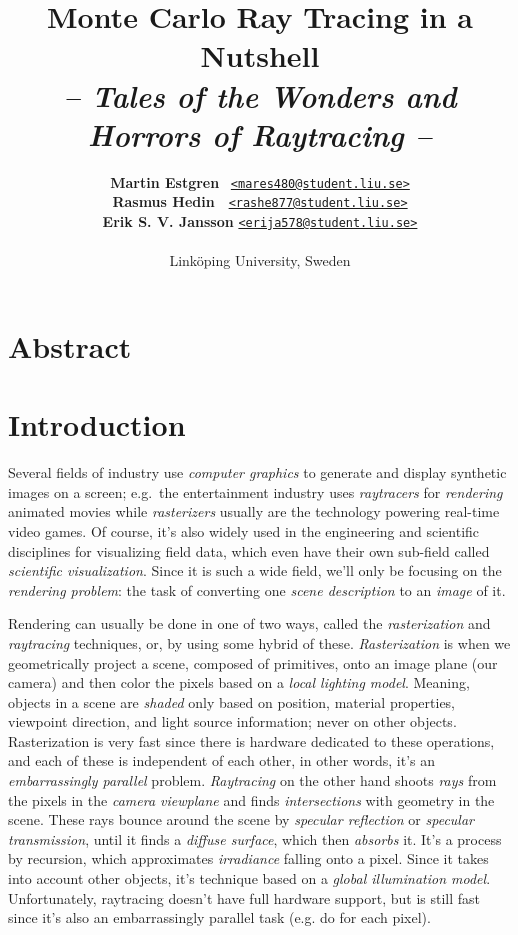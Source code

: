 \documentclass[a4paper, twocolumn]{article}
\title{\textbf{Monte Carlo Ray Tracing in a Nutshell}\\
       \Large{\textit{-- Tales of the Wonders and Horrors of Raytracing --}}}
\author{{\textbf{Martin Estgren}} \;\;\;\;\;\;\,   {\href{mailto:mares480@student.liu.se}
                                                       {\texttt{<mares480@student.liu.se>}}} \\
        {\textbf{Rasmus Hedin}} \;\;\;\;\;\;\;\,\, {\href{mailto:rashe877@student.liu.se}
                                                       {\texttt{<rashe877@student.liu.se>}}} \\
        {\textbf{Erik S. V. Jansson}} \;           {\href{mailto:erija578@student.liu.se}
                                                       {\texttt{<erija578@student.liu.se>}}} \\~\\
        {Linköping University, Sweden}\vspace{-2.0ex}}
\begin{document}
    \maketitle
    \section*{Abstract}

    \newpage \tableofcontents \clearpage

    \section{Introduction} \label{sec:introduction}

        Several fields of industry use \emph{computer graphics} to generate and display synthetic images on a screen; e.g.\ the entertainment industry uses \emph{raytracers} for \emph{rendering} animated movies while \emph{rasterizers} usually are the technology powering real-time video games. Of course, it's also widely used in the engineering and scientific disciplines for visualizing field data, which even have their own sub-field called \emph{scientific visualization}. Since it is such a wide field, we'll only be focusing on the \emph{rendering problem}: the task of converting one \emph{scene description} to an \emph{image} of it.

        Rendering can usually be done in one of two ways, called the \emph{rasterization} and \emph{raytracing} techniques, or, by using some hybrid of these. \emph{Rasterization} is when we geometrically project a scene, composed of primitives, onto an image plane (our camera) and then color the pixels based on a \emph{local lighting model}. Meaning, objects in a scene are \emph{shaded} only based on position, material properties, viewpoint direction, and light source information; never on other objects. Rasterization is very fast since there is hardware dedicated to these operations, and each of these is independent of each other, in other words, it's an \emph{embarrassingly parallel} problem. \emph{Raytracing} on the other hand shoots \emph{rays} from the pixels in the \emph{camera viewplane} and finds \emph{intersections} with geometry in the scene. These rays bounce around the scene by \emph{specular reflection} or \emph{specular transmission}, until it finds a \emph{diffuse surface}, which then \emph{absorbs} it. It's a process by recursion, which approximates \emph{irradiance} falling onto a pixel. Since it takes into account other objects, it's technique based on a \emph{global illumination model}. Unfortunately, raytracing doesn't have full hardware support, but is still fast since it's also an embarrassingly parallel task (e.g. do for each pixel).
\end{document}
